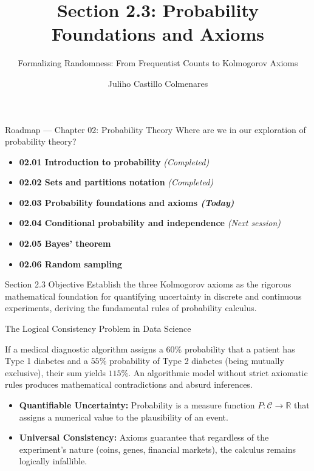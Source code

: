\documentclass[10pt,aspectratio=169]{beamer}
\title[Foundations and Axioms]{Section 2.3: Probability Foundations and Axioms}
\subtitle{Formalizing Randomness: From Frequentist Counts to Kolmogorov Axioms}
\author[J. Castillo Colmenares]{Juliho Castillo Colmenares}
\institute{Tecnológico de Monterrey}
\date{}
\begin{document}
\begin{frame}[plain]
  \titlepage
\end{frame}

\begin{frame}{Roadmap — Chapter 02: Probability Theory}
  Where are we in our exploration of probability theory? \pause
  \begin{itemize}
    \item \textbf{02.01 Introduction to probability} \emph{(Completed)} \pause
    \item \textbf{02.02 Sets and partitions notation} \emph{(Completed)} \pause
    \item \color{TecRojo}\textbf{02.03 Probability foundations and axioms \emph{(Today)}}\color{black} \pause
    \item \textbf{02.04 Conditional probability and independence} \emph{(Next session)} \pause
    \item \textbf{02.05 Bayes' theorem} \pause
    \item \textbf{02.06 Random sampling}
  \end{itemize}
  \vspace{0.6em}
  \begin{block}{Section 2.3 Objective}
    Establish the three Kolmogorov axioms as the rigorous mathematical foundation for quantifying uncertainty in discrete and continuous experiments, deriving the fundamental rules of probability calculus.
  \end{block}
\end{frame}

\begin{frame}{The Logical Consistency Problem in Data Science}
  \begin{motivacion}
    If a medical diagnostic algorithm assigns a $60\%$ probability that a patient has Type 1 diabetes and a $55\%$ probability of Type 2 diabetes (being mutually exclusive), their sum yields $115\%$. An algorithmic model without strict axiomatic rules produces mathematical contradictions and absurd inferences.
  \end{motivacion}
  
  \vspace{0.4em}
  \pause
  \begin{itemize}
    \item \textbf{Quantifiable Uncertainty:} Probability is a measure function $P: \mathcal{C} \to \mathbb{R}$ that assigns a numerical value to the plausibility of an event. \pause
    \item \textbf{Universal Consistency:} Axioms guarantee that regardless of the experiment's nature (coins, genes, financial markets), the calculus remains logically infallible.
  \end{itemize}
\end{frame}
\end{document}

